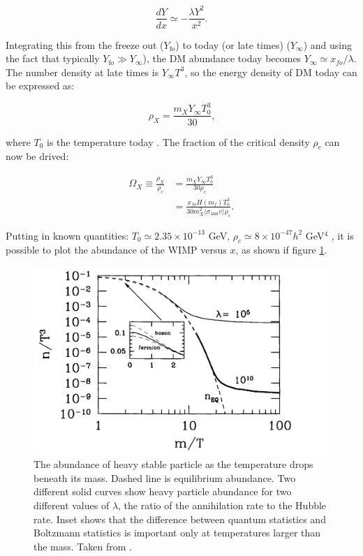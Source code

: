 \begin{equation}\label{dYdx}
\frac{dY}{dx} \simeq - \frac{\lambda Y^2}{x^2} \text{.}
\end{equation}

Integrating this from the freeze out ($Y_{\text{fo}}$) to today (or late times) ($Y_{\infty}$) and using the fact that typically $Y_{\text{fo}} \gg Y_{\infty}$), the DM abundance today becomes $Y_{\infty} \simeq x_{fo}/\lambda$. The number density at late times is $Y_{\infty} T^3$, so the energy density of DM today can be expressed as:

\begin{equation}
\rho_X = \frac{m_X Y_{\infty} T_0^3}{30} \text{,}
\end{equation}

where $T_0$ is the temperature today \cite{Dodelson:2003ft}. The fraction of the critical density $\rho_c$ can now be drived:

\begin{equation}
\begin{split}
\Omega_X \equiv \frac{\rho_X}{\rho_c} &= \frac{m_X Y_{\infty} T_0^3}{30 \rho_c}\\
 & = \frac{x_{fo} H(m_f) T_0^3}{30 m_X^2 \langle \sigma_{\text{ann}} v \rangle \rho_c} \text{.}
\end{split}
\end{equation}

Putting in known quantities: $T_0 \simeq 2.35 \times 10^{-13}$ GeV, $\rho_c \simeq 8 \times 10^{-47} h^2$ GeV$^4$ \cite{Roszkowski:2017nbc}, it is possible to plot the abundance of the WIMP versus $x$, as shown if figure \ref{}. 

\begin{figure}[h]
\begin{center}
\includegraphics[width=0.8\linewidth]{dmabundance} 
\caption{The abundance of heavy stable particle as the temperature drops beneath its mass. Dashed line is equilibrium abundance. Two different solid curves show heavy particle abundance for two different values of $\lambda$, the ratio of the annihilation rate to the Hubble rate. Inset shows that the difference between quantum statistics and Boltzmann statistics is important only at temperatures larger than the mass. Taken from \cite{Dodelson:2003ft}.}
\label{}
\end{center}
\end{figure}

